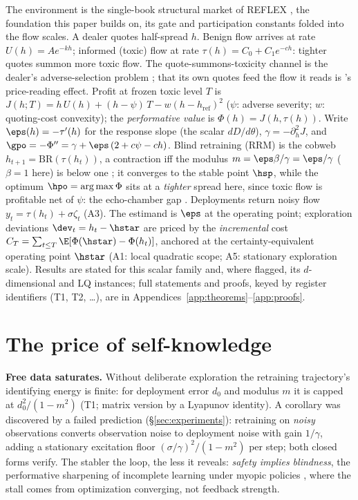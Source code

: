 \documentclass{article}
\begin{document}
The environment is the single-book structural market of REFLEX \citep{reflex2026}, the foundation this paper builds on, its gate and participation constants folded into the flow scales. A dealer quotes half-spread $h$. Benign flow arrives at rate $U(h) = A e^{-kh}$; informed (toxic) flow at rate $\tau(h) = C_0 + C_1 e^{-c h}$: tighter quotes summon more toxic flow. The quote-summons-toxicity channel is the dealer's adverse-selection problem \citep{gueant2013inventory}; that its own quotes feed the flow it reads is \citet{barzykin2026quoting}'s price-reading effect. Profit at frozen toxic level $T$ is $J(h;T) = h\,U(h) + (h - \psi)\,T - w (h - h_{\mathrm{ref}})^2$ ($\psi$: adverse severity; $w$: quoting-cost convexity); the \emph{performative value} is $\Phi(h) = J(h,\tau(h))$. Write $\eps(h) = -\tau'(h)$ for the response slope (the scalar $dD/d\theta$), $\gamma = -\partial^2_h J$, and $\gpo = -\Phi'' = \gamma + \eps\,(2 + c\psi - ch)$. Blind retraining (RRM) is the cobweb $h_{t+1} = \mathrm{BR}(\tau(h_t))$, a contraction iff the modulus $m = \eps\beta/\gamma = \eps/\gamma$ ($\beta = 1$ here) is below one \citep{perdomo2020performative}; it converges to the stable point $\hsp$, while the optimum $\hpo = \arg\max\Phi$ sits at a \emph{tighter} spread here, since toxic flow is profitable net of $\psi$: the echo-chamber gap \citep{miller2021outside}. Deployments return noisy flow $y_t = \tau(h_t) + \sigma\zeta_t$ (A3). The estimand is $\eps$ at the operating point; exploration deviations $\dev_t = h_t - \hstar$ are priced by the \emph{incremental} cost $C_T = \sum_{t \le T} \E[\Phi(\hstar) - \Phi(h_t)]$, anchored at the certainty-equivalent operating point $\hstar$ (A1: local quadratic scope; A5: stationary exploration scale). Results are stated for this scalar family and, where flagged, its $d$-dimensional and LQ instances; full statements and proofs, keyed by register identifiers (T1, T2, \ldots), are in Appendices~\ref{app:theorems}--\ref{app:proofs}.

\section{The price of self-knowledge}
\label{sec:price}

\textbf{Free data saturates.} Without deliberate exploration the retraining trajectory's identifying energy is finite: for deployment error $d_0$ and modulus $m$ it is capped at $d_0^2/(1-m^2)$ (T1; matrix version by a Lyapunov identity). A corollary was discovered by a failed prediction (\S\ref{sec:experiments}): retraining on \emph{noisy} observations converts observation noise to deployment noise with gain $1/\gamma$, adding a stationary excitation floor $(\sigma/\gamma)^2/(1-m^2)$ per step; both closed forms verify. The stabler the loop, the less it reveals: \emph{safety implies blindness}, the performative sharpening of incomplete learning under myopic policies \citep{keskin2014dynamic,harrison2012bayesian}, where the stall comes from optimization converging, not feedback strength.
\end{document}
